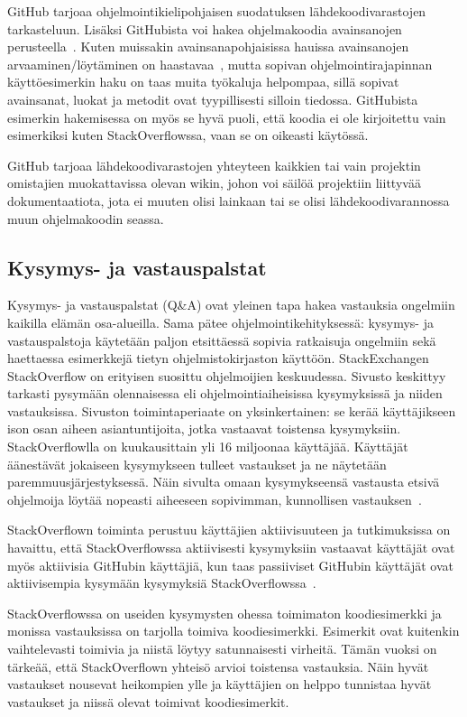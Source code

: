 \documentclass[finnish]{tktltiki2}
\theoremstyle{definition}
\theoremstyle{remark}
\begin{document}
GitHub tarjoaa ohjelmointikielipohjaisen suodatuksen lähdekoodivarastojen tarkasteluun. Lisäksi GitHubista voi hakea ohjelmakoodia avainsanojen perusteella~\cite{social-networking-meets-se}. Kuten muissakin avainsanapohjaisissa hauissa avainsanojen arvaaminen/löytäminen on haastavaa~\cite{what-to-search-for}, mutta sopivan ohjelmointirajapinnan käyttöesimerkin haku on taas muita työkaluja helpompaa, sillä sopivat avainsanat, luokat ja metodit ovat tyypillisesti silloin tiedossa. GitHubista esimerkin hakemisessa on myös se hyvä puoli, että koodia ei ole kirjoitettu vain esimerkiksi kuten StackOverflowssa, vaan se on oikeasti käytössä.

GitHub tarjoaa lähdekoodivarastojen yhteyteen kaikkien tai vain projektin omistajien muokattavissa olevan wikin, johon voi säilöä projektiin liittyvää dokumentaatiota, jota ei muuten olisi lainkaan tai se olisi lähdekoodivarannossa muun ohjelmakoodin seassa.

\subsection{Kysymys- ja vastauspalstat}
Kysymys- ja vastauspalstat (Q\&A) ovat yleinen tapa hakea vastauksia ongelmiin kaikilla elämän osa-alueilla. Sama pätee ohjelmointikehityksessä: kysymys- ja vastauspalstoja käytetään paljon etsittäessä sopivia ratkaisuja ongelmiin sekä haettaessa esimerkkejä tietyn ohjelmistokirjaston käyttöön. StackExchangen StackOverflow on erityisen suosittu ohjelmoijien keskuudessa. Sivusto keskittyy tarkasti pysymään olennaisessa eli ohjelmointiaiheisissa kysymyksissä ja niiden vastauksissa. Sivuston toimintaperiaate on yksinkertainen: se kerää käyttäjikseen ison osan aiheen asiantuntijoita, jotka vastaavat toistensa kysymyksiin. StackOverflowlla on kuukausittain yli 16 miljoonaa käyttäjää. Käyttäjät äänestävät jokaiseen kysymykseen tulleet vastaukset ja ne näytetään paremmuusjärjestyksessä. Näin sivulta omaan kysymykseensä vastausta etsivä ohjelmoija löytää nopeasti aiheeseen sopivimman, kunnollisen vastauksen~\cite{social-networking-meets-se}.

StackOverflown toiminta perustuu käyttäjien aktiivisuuteen ja tutkimuksissa on havaittu, että StackOverflowssa aktiivisesti kysymyksiin vastaavat käyttäjät ovat myös aktiivisia GitHubin käyttäjiä, kun taas passiiviset GitHubin käyttäjät ovat aktiivisempia kysymään kysymyksiä StackOverflowssa~\cite{stackoverflow-and-github}.

StackOverflowssa on useiden kysymysten ohessa toimimaton koodiesimerkki ja monissa vastauksissa on tarjolla toimiva koodiesimerkki. Esimerkit ovat kuitenkin vaihtelevasti toimivia ja niistä löytyy satunnaisesti virheitä. Tämän vuoksi on tärkeää, että StackOverflown yhteisö arvioi toistensa vastauksia. Näin hyvät vastaukset nousevat heikompien ylle ja käyttäjien on helppo tunnistaa hyvät vastaukset ja niissä olevat toimivat koodiesimerkit.
\end{document}
